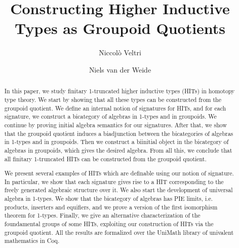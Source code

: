 \documentclass{lmcs}
\theoremstyle{plain}
\theoremstyle{definition}
\begin{document}
	
\lstset{language=Coq}

\title{Constructing Higher Inductive Types as Groupoid Quotients}


\author{Niccol{\`o} Veltri}
\address{Tallinn University of Technology, Estonia}

\author{Niels van der Weide}
\address{Radboud University, Nijmegen, The Netherlands}

\begin{abstract}
In this paper, we study finitary 1-truncated higher inductive types (HITs) in homotopy type theory. We start by showing that all these types can be constructed from the groupoid quotient. We define an internal notion of signatures for HITs, and for each signature, we construct a bicategory of algebras in 1-types and in groupoids. We continue by proving initial algebra semantics for our signatures. After that, we show that the groupoid quotient induces a biadjunction between the bicategories of algebras in 1-types and in groupoids. Then we construct a biinitial object in the bicategory of algebras in groupoids, which gives the desired algebra. From all this, we conclude that all finitary 1-truncated HITs can be constructed from the groupoid quotient.

We present several examples of HITs which are definable using our notion of signature. In particular, we show that each signature gives rise to a HIT corresponding to the freely generated algebraic structure over it. We also start the development of universal algebra in 1-types. We show that the bicategory of algebras has PIE limits, i.e. products, inserters and equifiers, and we prove a version of the first isomorphism theorem for 1-types. Finally, we give an alternative characterization of the foundamental groups of some HITs, exploiting our construction of HITs via the groupoid quotient. All the results are formalized over the UniMath library of univalent mathematics in Coq.
\end{abstract}
\end{document}
